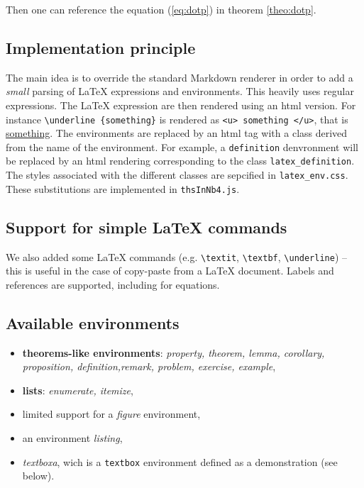 \documentclass[11pt]{article}
\providecommand{\tightlist}{%
      \setlength{\itemsep}{0pt}\setlength{\parskip}{0pt}}
\begin{document}
Then one can reference the equation (\ref{eq:dotp}) in theorem
\ref{theo:dotp}.

    \subsection{Implementation principle}\label{implementation-principle}

    The main idea is to override the standard Markdown renderer in order to
add a \emph{small} parsing of LaTeX expressions and environments. This
heavily uses regular expressions. The LaTeX expression are then rendered
using an html version. For instance
\texttt{\textbackslash{}underline\ \{something\}} is rendered as
\texttt{\textless{}u\textgreater{}\ something\ \textless{}/u\textgreater{}},
that is \underline{something}. The environments are replaced by an html
tag with a class derived from the name of the environment. For example,
a \texttt{definition} denvronment will be replaced by an html rendering
corresponding to the class \texttt{latex\_definition}. The styles
associated with the different classes are sepcified in
\texttt{latex\_env.css}. These substitutions are implemented in
\texttt{thsInNb4.js}.

    \subsection{Support for simple LaTeX
commands}\label{support-for-simple-latex-commands}

    We also added some LaTeX commands (e.g. \texttt{\textbackslash{}textit},
\texttt{\textbackslash{}textbf}, \texttt{\textbackslash{}underline}) --
this is useful in the case of copy-paste from a LaTeX document. Labels
and references are supported, including for equations.

    \subsection{Available environments}\label{available-environments}

    \begin{itemize}
\tightlist
\item
  \textbf{theorems-like environments}: \emph{property, theorem, lemma,
  corollary, proposition, definition,remark, problem, exercise,
  example},
\item
  \textbf{lists}: \emph{enumerate, itemize},\\
\item
  limited support for a \emph{figure} environment,
\item
  an environment \emph{listing},
\item
  \emph{textboxa}, wich is a \texttt{textbox} environment defined as a
  demonstration (see below).
\end{itemize}
\end{document}
